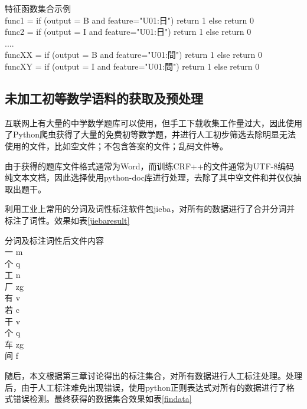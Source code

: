 {特征函数集合示例\\}
{
func1 = if (output = B and feature="U01:日") return 1 else return 0\\
func2 = if (output = I and feature="U01:日") return 1 else return 0\\
....\\
funcXX = if (output = B and feature="U01:問") return 1  else return 0\\
funcXY = if (output = I and feature="U01:問") return 1  else return 0\\
}
{
}

\subsection{未加工初等数学语料的获取及预处理}
互联网上有大量的中学数学题库可以使用，但手工下载收集工作量过大，因此使用了Python爬虫获得了大量的免费初等数学题，并进行人工初步筛选去除明显无法使用的文件，比如空文件；不包含答案的文件；乱码文件等。

由于获得的题库文件格式通常为Word，而训练CRF++的文件通常为UTF-8编码纯文本文档，因此选择使用python-doc库进行处理，去除了其中空文件和并仅仅抽取出题干。

利用工业上常用的分词及词性标注软件包jieba，对所有的数据进行了合并分词并标注了词性。效果如表\ref{jiebaresult}

{分词及标注词性后文件内容\\}
{
一 m\\
个 q\\
工 n\\
厂 zg\\
有 v\\
若 c\\
干 v\\
个 q\\
车 zg\\
间 f\\
}
{
}

随后，本文根据第三章讨论得出的标注集合，对所有数据进行人工标注处理。处理后，由于人工标注难免出现错误，使用python正则表达式对所有的数据进行了格式错误检测。最终获得的数据集合效果如表\ref{findata}

